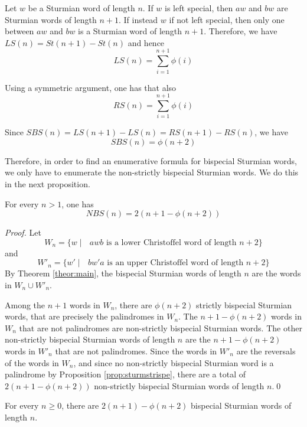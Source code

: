 \documentclass{llncs}
\newcommand{\LS}{\textit{LS}}
\newcommand{\RS}{\textit{RS}}
\newcommand{\SBS}{\textit{SBS}}
\newcommand{\WBS}{\textit{NBS}}
\begin{document}
Let $w$ be a Sturmian word of length $n$. If $w$ is left special, then $aw$ and $bw$ are Sturmian words of length $n+1$. If instead $w$ if not left special, then only one between $aw$ and $bw$ is a Sturmian word of length $n+1$. Therefore, we have $\LS(n)=St(n+1)-St(n)$ and hence
\[\LS(n)=\sum_{i=1}^{n+1}\phi(i)\]

Using a symmetric argument, one has that also \[\RS(n)=\sum_{i=1}^{n+1}\phi(i)\]

Since \cite{DelMi94} $\SBS(n)=\LS(n+1)-\LS(n)=\RS(n+1)-\RS(n)$, we have
\[\SBS(n)=\phi(n+2)\]

Therefore, in order to find an enumerative formula for bispecial Sturmian words, we only have to enumerate the non-strictly bispecial Sturmian words. We do this in the next proposition.

\begin{proposition}
For every $n>1$, one has \[\WBS(n)=2\left(n+1-\phi(n+2)\right)\]
\end{proposition}

\begin{proof}
Let \[W_{n}=\{w \mid \mbox{  $awb$ is a lower Christoffel word of length $n+2$} \}\] and \[W'_{n}=\{w' \mid \mbox{  $bw'a$ is an upper Christoffel word of length $n+2$} \}\] By Theorem \ref{theor:main}, the bispecial Sturmian words of length $n$ are the words in $W_{n}\cup W'_{n}$. 

Among the $n+1$ words in $W_{n}$, there are $\phi(n+2)$ strictly bispecial Sturmian words, that are precisely the palindromes in $W_{n}$. The $n+1-\phi(n+2)$ words in $W_{n}$ that are not palindromes are non-strictly bispecial Sturmian words. The other non-strictly bispecial Sturmian words of length $n$ are the $n+1-\phi(n+2)$ words in $W'_{n}$ that are not palindromes. Since the words in $W'_{n}$ are the reversals of the words in $W_{n}$, and since no non-strictly bispecial Sturmian word is a palindrome by Proposition \ref{prop:sturmstrispe}, there are a total of $2(n+1-\phi(n+2))$ non-strictly bispecial Sturmian words of length $n$.\qed
\end{proof}

\begin{corollary}\label{cor:formula}
 For every $n\ge 0$, there are $2(n+1)-\phi(n+2)$ bispecial Sturmian words of length $n$.
\end{corollary}
\end{document}
